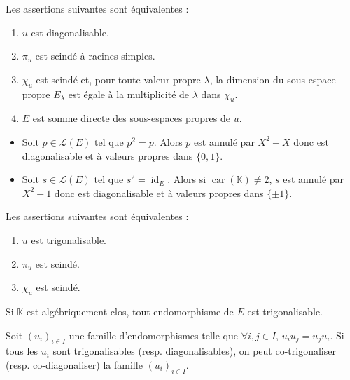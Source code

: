 
  \begin{theorem}
    Les assertions suivantes sont équivalentes :
    \begin{enumerate}[label={\bfseries(\roman*)}]
      \item $u$ est diagonalisable.
      \item $\pi_u$ est scindé à racines simples.
      \item $\chi_u$ est scindé et, pour toute valeur propre $\lambda$, la dimension du sous-espace propre $E_\lambda$ est égale à la multiplicité de $\lambda$ dans $\chi_u$.
      \item $E$ est somme directe des sous-espaces propres de $u$.
    \end{enumerate}
  \end{theorem}

  \begin{example}
    \begin{itemize}
      \item Soit $p \in \mathcal{L}(E)$ tel que $p^2 = p$. Alors $p$ est annulé par $X^2 - X$ donc est diagonalisable et à valeurs propres dans $\{ 0, 1 \}$.
      \item Soit $s \in \mathcal{L}(E)$ tel que $s^2 = \operatorname{id}_E$. Alors si $\operatorname{car}(\mathbb{K}) \neq 2$, $s$ est annulé par $X^2 - 1$ donc est diagonalisable et à valeurs propres dans $\{ \pm 1 \}$.
    \end{itemize}
  \end{example}

  \begin{theorem}
    Les assertions suivantes sont équivalentes :
    \begin{enumerate}[label={\bfseries(\roman*)}]
      \item $u$ est trigonalisable.
      \item $\pi_u$ est scindé.
      \item $\chi_u$ est scindé.
    \end{enumerate}
  \end{theorem}

  \begin{example}
    Si $\mathbb{K}$ est algébriquement clos, tout endomorphisme de $E$ est trigonalisable.
  \end{example}


  \begin{theorem}
    \label{151-1}
    Soit $(u_i)_{i \in I}$ une famille d'endomorphismes telle que $\forall i, j \in I, \, u_i u_j = u_j u_i$. Si tous les $u_i$ sont trigonalisables (resp. diagonalisables), on peut co-trigonaliser (resp. co-diagonaliser) la famille $(u_i)_{i \in I}$.
  \end{theorem}

